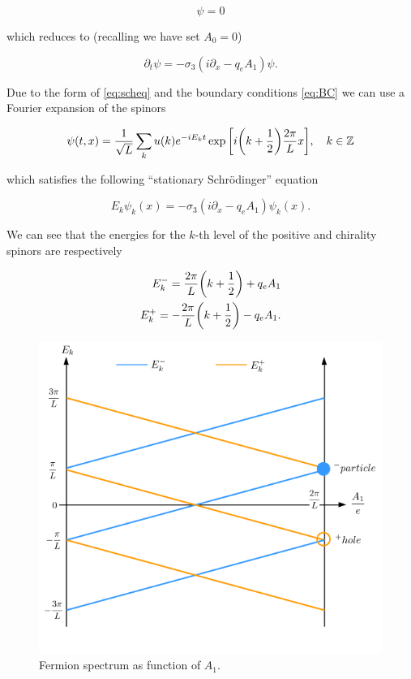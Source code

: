 \begin{equation*}
	[i (\gamma^0 \partial_t + \gamma^1 \partial_x) + q_e (\gamma^0 A_0 + \gamma^1 A_1)]\psi = 0 
\end{equation*}

which reduces to (recalling we have set $A_0=0$) 

\begin{equation}
\partial_t \psi =- \sigma_3(i \partial_x - q_e A_1)\psi  \label{eq:scheq}.
\end{equation}

Due to the form of \eqref{eq:scheq} and the boundary conditions \eqref{eq:BC} we can use a Fourier expansion of the spinors 

\begin{equation}\label{eq:fourierSpinor}
\psi(t,x) = \frac{1}{\sqrt{L}} \sum_k u(k) e^{-iE_kt}\exp\qty[i\qty(k + \frac{1}{2})\frac{2\pi}{L} x],\quad k\in\mathbb{Z} 
\end{equation}

which satisfies the following ``stationary Schrödinger'' equation

\begin{equation}
E_k \psi_k(x) = -\sigma_3 (i\partial_x - q_e A_1)\psi_k(x).
\end{equation}

We can see that the energies for the $k$-th level of the positive and chirality spinors are respectively

\begin{align}
E_k^- = \frac{2\pi}{L}\qty(k + \frac{1}{2}) + q_e A_1\label{eq:energy+}\\
E_k^+ = -\frac{2\pi}{L}\qty(k + \frac{1}{2}) - q_e A_1\label{eq:energy-}.
\end{align}

\begin{figure}[htb]
    \centering
    \includegraphics[scale=0.5]{figures/spectrum.png}
    \caption{Fermion spectrum as function of $A_1$.}
    \label{fig:spectrum}
\end{figure}

